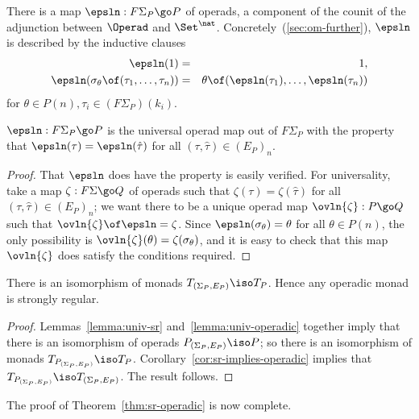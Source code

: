 There is a map $\epsln: F\Sigma_P \go P$ of operads, a component of the
counit of the adjunction between $\Operad$ and $\Set^\nat$.
Concretely~(\ref{sec:om-further}), $\epsln$ is described by the inductive
clauses
%
\begin{eqnarray*}
\epsln(1)	&=	&1,	\\
\epsln(\sigma_\theta \of (\tau_1, \ldots, \tau_n))	&
=	&
\theta \of (\epsln(\tau_1), \ldots, \epsln(\tau_n))	
\end{eqnarray*}
%
for $\theta\in P(n), \tau_i\in (F\Sigma_P)(k_i)$.
%
\begin{lemma}	
$\epsln: F\Sigma_P \go P$ is the universal operad map out of $F\Sigma_P$
with the property that $\epsln(\tau) = \epsln(\hat{\tau})$ for all
$(\tau,\hat{\tau}) \in (E_P)_n$.
\end{lemma}
%
\begin{proof}
That $\epsln$ does have the property is easily verified.  For universality,
take a map $\zeta: F\Sigma \go Q$ of operads such that $\zeta(\tau) =
\zeta(\hat{\tau})$ for all $(\tau,\hat{\tau}) \in (E_P)_n$; we want there
to be a unique operad map $\ovln{\zeta}: P \go Q$ such that $\ovln{\zeta}
\of \epsln = \zeta$.  Since $\epsln(\sigma_\theta) = \theta$ for all
$\theta \in P(n)$, the only possibility is $\ovln{\zeta}(\theta) =
\zeta(\sigma_\theta)$, and it is easy to check that this map $\ovln{\zeta}$
does satisfy the conditions required.  \done
\end{proof}

\begin{cor}	
There is an isomorphism of monads $T_{(\Sigma_P,E_P)} \iso T_P$.  Hence any
operadic monad is strongly regular.
\end{cor}
%
\begin{proof}
Lemmas~\ref{lemma:univ-sr} and~\ref{lemma:univ-operadic} together imply
that there is an isomorphism of operads $P_{(\Sigma_P,E_P)} \iso P$; so
there is an isomorphism of monads $T_{P_{(\Sigma_P,E_P)}} \iso T_P$.
Corollary~\ref{cor:sr-implies-operadic} implies that
$T_{P_{(\Sigma_P,E_P)}} \iso T_{(\Sigma_P,E_P)}$.  The result follows.
\done
\end{proof}

The proof of Theorem~\ref{thm:sr-operadic} is now complete.

